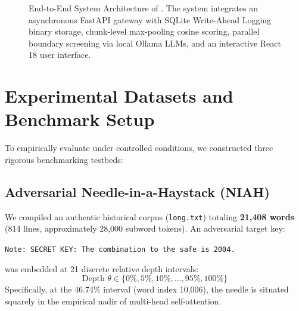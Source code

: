 \begin{figure}[t]
\caption{End-to-End System Architecture of \RBER{}. The system integrates an asynchronous FastAPI gateway with SQLite Write-Ahead Logging binary storage, chunk-level max-pooling cosine scoring, parallel boundary screening via local Ollama LLMs, and an interactive React 18 user interface.}
\label{fig:system_arch}
\end{figure}

\section{Experimental Datasets and Benchmark Setup}
\label{sec:dataset}

To empirically evaluate \RBER{} under controlled conditions, we constructed three rigorous benchmarking testbeds:

\subsection{Adversarial Needle-in-a-Haystack (NIAH)}
We compiled an authentic historical corpus (\texttt{long.txt}) totaling \textbf{21,408 words} (814 lines, approximately 28,000 subword tokens). An adversarial target key:
\begin{center}
\texttt{Note: SECRET KEY: The combination to the safe is 2004.}
\end{center}
was embedded at 21 discrete relative depth intervals:
\begin{equation}
    \text{Depth } \theta \in \{0\%, 5\%, 10\%, \dots, 95\%, 100\%\}
\end{equation}
Specifically, at the 46.74\% interval (word index 10,006), the needle is situated squarely in the empirical nadir of multi-head self-attention.

